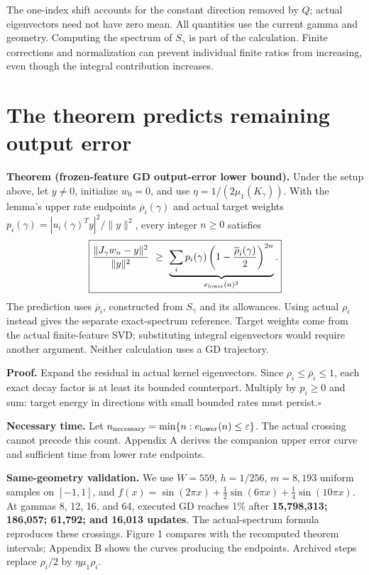 \documentclass[11pt]{article}
\begin{document}
The one-index shift accounts for the constant direction removed by $Q$;
actual eigenvectors need not have zero mean. All quantities use the current
gamma and geometry. Computing the spectrum of $S_\gamma$ is part of the
calculation. Finite corrections and normalization can prevent individual
finite ratios from increasing, even though the integral contribution increases.
\section{The theorem predicts remaining output error}
\textbf{Theorem (frozen-feature GD output-error lower bound).}
Under the setup above, let $y\ne0$, initialize $w_0=0$, and use
$\eta=1/(2\mu_1(K_\gamma))$. With the lemma's upper rate endpoints
$\overline\rho_i(\gamma)$ and actual target weights
$p_i(\gamma)=|u_i(\gamma)^Ty|^2/\|y\|^2$, every integer $n\ge0$ satisfies
\[
\boxed{\frac{\|J_\gamma w_n-y\|^2}{\|y\|^2}
\ \ge\ \underbrace{\sum_i p_i(\gamma)
\left(1-\frac{\overline\rho_i(\gamma)}2\right)^{2n}}_{e_{\rm lower}(n)^2}.}
\]
The prediction uses $\overline\rho_i$, constructed from $S_\gamma$ and its
allowances. Using actual $\rho_i$ instead gives the separate exact-spectrum
reference. Target weights come from the actual finite-feature SVD;
substituting integral eigenvectors would require another argument.
Neither calculation uses a GD trajectory.

\textbf{Proof.} Expand the residual in actual kernel eigenvectors.
Since $\rho_i\le\overline\rho_i\le1$, each exact decay factor is at least
its bounded counterpart. Multiply by $p_i\ge0$ and sum: target energy in
directions with small bounded rates must persist.\hfill$\square$

\textbf{Necessary time.} Let
$n_{\rm necessary}=\min\{n:e_{\rm lower}(n)\le\varepsilon\}$.
The actual crossing cannot precede this count. Appendix A derives the
companion upper error curve and sufficient time from lower rate endpoints.

\textbf{Same-geometry validation.} We use $W=559$, $h=1/256$, $m=8{,}193$
uniform samples on $[-1,1]$, and
$f(x)=\sin(2\pi x)+\frac12\sin(6\pi x)+\frac14\sin(10\pi x)$.
At gammas 8, 12, 16, and 64, executed GD reaches 1\% after
\textbf{15,798,313; 186,057; 61,792; and 16,013 updates}.
The actual-spectrum formula reproduces these crossings. Figure 1 compares
with the recomputed theorem intervals; Appendix B shows the curves producing
the endpoints. Archived steps replace $\rho_i/2$ by $\eta\mu_1\rho_i$.
\end{document}
